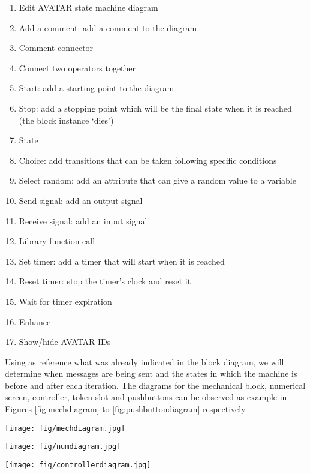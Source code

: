 \documentclass[12pt]{article}
\begin{document}
\begin{enumerate}
\item Edit AVATAR state machine diagram
\item Add a comment: add a comment to the diagram
\item Comment connector
\item Connect two operators together
\item Start: add a starting point to the diagram
\item Stop: add a stopping point which will be the final state when it is reached (the block instance `dies')
\item State
\item Choice: add transitions that can be taken following specific conditions
\item Select random: add an attribute that can give a random value to a variable
\item Send signal: add an output signal
\item Receive signal: add an input signal
\item Library function call
\item Set timer: add a timer that will start when it is reached
\item Reset timer: stop the timer's clock and reset it
\item Wait for timer expiration
\item Enhance
\item Show/hide AVATAR IDs
\end{enumerate}

Using as reference what was already indicated in the block diagram, we will determine when messages are being sent and the states in which the machine is before and after each iteration. The diagrams for the mechanical block, numerical screen, controller, token slot and pushbuttons can be observed as example in Figures \ref{fig:mechdiagram} to \ref{fig:pushbuttondiagram} respectively.
\begin{figure*}[htbp]
\centering
\texttt{[image: fig/mechdiagram.jpg]}
\caption{Mechanical block diagram} \label{fig:mechdiagram}
\end{figure*}

\begin{figure*}[htbp]
\centering
\texttt{[image: fig/numdiagram.jpg]}
\caption{Numerical screen diagram} \label{fig:numdiagram}
\end{figure*}

\begin{figure*}[htbp]
\centering
\texttt{[image: fig/controllerdiagram.jpg]}
\caption{Controller diagram} \label{fig:controllerdiagram}
\end{figure*}
\end{document}
